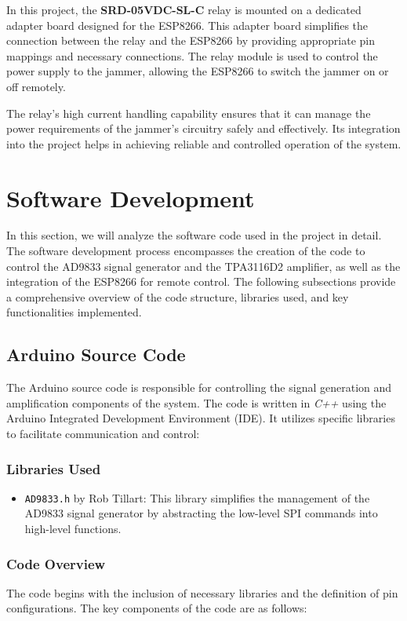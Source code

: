 In this project, the \textbf{SRD-05VDC-SL-C} relay is mounted on a dedicated adapter board designed for the ESP8266. This adapter board simplifies the connection between the relay and the ESP8266 by providing appropriate pin mappings and necessary connections. The relay module is used to control the power supply to the jammer, allowing the ESP8266 to switch the jammer on or off remotely. 

The relay's high current handling capability ensures that it can manage the power requirements of the jammer's circuitry safely and effectively. Its integration into the project helps in achieving reliable and controlled operation of the system.


\section{Software Development}

In this section, we will analyze the software code used in the project in detail. The software development process encompasses the creation of the code to control the AD9833 signal generator and the TPA3116D2 amplifier, as well as the integration of the ESP8266 for remote control. The following subsections provide a comprehensive overview of the code structure, libraries used, and key functionalities implemented.

\subsection{Arduino Source Code}

The Arduino source code is responsible for controlling the signal generation and amplification components of the system. The code is written in \textit{C++} using the Arduino Integrated Development Environment (IDE). It utilizes specific libraries to facilitate communication and control:

\subsubsection{Libraries Used}
\begin{itemize}
    \item \texttt{AD9833.h} by Rob Tillart: This library simplifies the management of the AD9833 signal generator by abstracting the low-level SPI commands into high-level functions.
\end{itemize}

\subsubsection{Code Overview}
The code begins with the inclusion of necessary libraries and the definition of pin configurations. The key components of the code are as follows:

